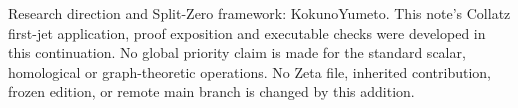 Research direction and Split-Zero framework: KokunoYumeto. This note's
Collatz first-jet application, proof exposition and executable checks
were developed in this continuation. No global priority claim is made
for the standard scalar, homological or graph-theoretic operations. No
Zeta file, inherited contribution, frozen edition, or remote main branch
is changed by this addition.
